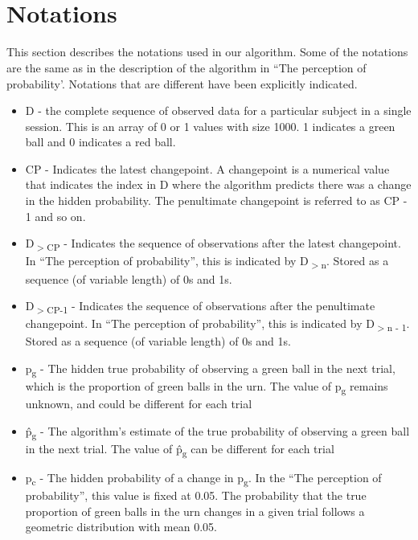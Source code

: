\documentclass{article}
\begin{document}
\section{\\Notations}
This section describes the notations used in our algorithm. Some of the notations are the same as in the description of the algorithm in ``The perception of probability'. Notations that are different have been explicitly indicated.
\begin{itemize}
\item D - the complete sequence of observed data for a particular subject in a single session. This is an array of 0 or 1 values with size 1000. 1 indicates a green ball and 0 indicates a red ball.

\item CP - Indicates the latest changepoint. A changepoint is a numerical value that indicates the index in D where the algorithm predicts there was a change in the hidden probability. The penultimate changepoint is referred to as CP - 1 and so on.

\item D\textsubscript{$>$CP} - Indicates the sequence of observations after the latest changepoint. In ``The perception of probability'', this is indicated by D\textsubscript{$>$n}. Stored as a sequence (of variable length) of 0s and 1s.

\item D\textsubscript{$>$CP-1} - Indicates the sequence of observations after the penultimate changepoint. In ``The perception of probability'', this is indicated by D\textsubscript{$>$n - 1}. Stored as a sequence (of variable length) of 0s and 1s.

\item p\textsubscript{g} - The hidden true probability of observing a green ball in the next trial, which is the proportion of green balls in the urn. The value of p\textsubscript{g} remains unknown, and could be different for each trial

\item \^{p\textsubscript{g}} - The algorithm's estimate of the true probability of observing a green ball in the next trial.  The value of \^{p\textsubscript{g}} can be different for each trial

\item p\textsubscript{c} - The hidden probability of a change in p\textsubscript{g}. In the ``The perception of probability'', this value is fixed at 0.05. The probability that the true proportion of green balls in the urn changes in a given trial follows a geometric distribution with mean 0.05. 


\end{itemize}
\end{document}
